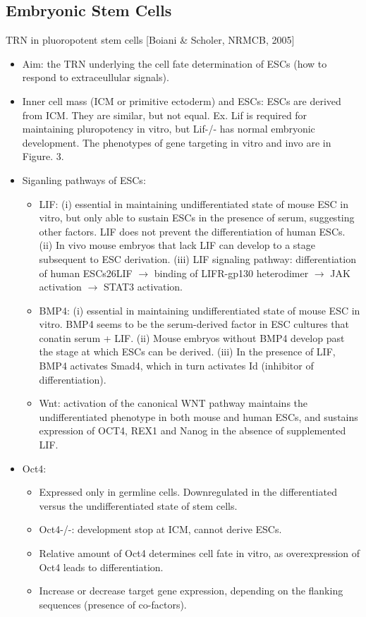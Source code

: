 \documentclass{report}
\begin{document}
\subsection{Embryonic Stem Cells}
	
TRN in pluoropotent stem cells [Boiani \& Scholer, NRMCB, 2005]
\begin{itemize}
\item Aim: the TRN underlying the cell fate determination of ESCs (how to respond to extraceullular signals). 
			
\item Inner cell mass (ICM or primitive ectoderm) and ESCs: ESCs are derived from ICM. They are similar, but not equal. Ex. Lif is required for maintaining pluropotency in vitro, but Lif-/- has normal embryonic development. The phenotypes of gene targeting in vitro and invo are in Figure. 3. 
		
\item Siganling pathways of ESCs: 
\begin{itemize}
	\item LIF: (i) essential in maintaining undifferentiated state of mouse ESC in vitro, but only able to sustain ESCs in the presence of serum, suggesting other factors. LIF does not prevent the differentiation of human ESCs. (ii) In vivo mouse embryos that lack LIF can develop to a stage subsequent to ESC derivation. (iii) LIF signaling pathway: differentiation of human ESCs26LIF $\rightarrow$ binding of LIFR-gp130 heterodimer $\rightarrow$ JAK activation $\rightarrow$ STAT3 activation. 
	\item BMP4: (i) essential in maintaining undifferentiated state of mouse ESC in vitro. BMP4 seems to be the serum-derived factor in ESC cultures that
	conatin serum + LIF. (ii) Mouse embryos without BMP4 develop past the stage at which ESCs can be derived. (iii) In the presence of LIF, BMP4 activates Smad4, which in turn activates Id (inhibitor of differentiation). 
	\item Wnt: activation of the canonical WNT pathway maintains the undifferentiated phenotype in both mouse and human ESCs, and sustains expression of  OCT4, REX1 and Nanog in the absence of supplemented LIF. 
\end{itemize}
		
\item Oct4: 
\begin{itemize}
	\item Expressed only in germline cells. Downregulated in the differentiated versus the undifferentiated state of stem cells. 
	\item Oct4-/-: development stop at ICM, cannot derive ESCs. 
	\item Relative amount of Oct4 determines cell fate in vitro, as overexpression of Oct4 leads to differentiation. 
	\item Increase or decrease target gene expression, depending on the flanking sequences (presence of co-factors). 
\end{itemize}
		

\end{itemize}
\end{document}
